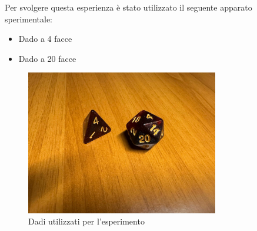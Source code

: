 Per svolgere questa esperienza è stato utilizzato il seguente apparato sperimentale:
\begin{itemize}
	\item Dado a 4 facce
	\item Dado a 20 facce
\end{itemize}

\begin{figure}[H]
	\centering
	\includegraphics[width=0.75\textwidth]{dadi.jpg}
	\caption{Dadi utilizzati per l'esperimento}
\end{figure}
